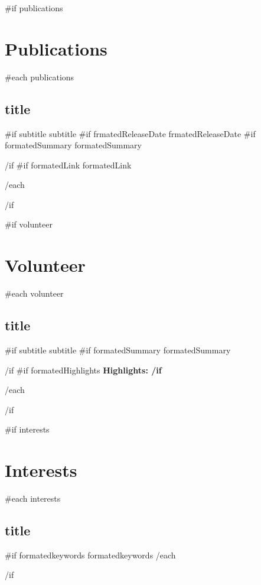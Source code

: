 \documentclass{article}
\begin{document}
{{#if publications}}\section*{Publications}{
  {{#each publications}}
    \subsection*{ {{ title }} } {
      {{#if subtitle}}{{ subtitle }} \ignorespaces
      {{#if frmatedReleaseDate}}{{ frmatedReleaseDate }} \ignorespaces
      {{#if formatedSummary}}
        {{ formatedSummary }} 
        \par
      {{/if}}\ignorespaces
      {{#if formatedLink}}{{ formatedLink }} \ignorespaces
    }
  {{/each}}
}{{/if}}\ignorespaces

{{#if volunteer}}\section*{Volunteer} {
  {{#each volunteer}}
    \subsection*{ {{ title }} } {
      {{#if subtitle}}{{ subtitle }} \ignorespaces
      {{#if formatedSummary}}
        {{ formatedSummary }}
        \par
      {{/if}}\ignorespaces
      {{#if formatedHighlights}}
        \bfseries Highlights: \newline
      {{/if}}\ignorespaces
    }
  {{/each}}
}{{/if}}\ignorespaces

{{#if interests}}\section*{Interests}{
  {{#each interests}}
    \subsection*{ {{ title }} } {
      {{#if formatedkeywords}}{{ formatedkeywords }}\ignorespaces
    }
  {{/each}}
}{{/if}}\ignorespaces
\end{document}

